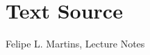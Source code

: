 \documentclass{ximera}
\begin{document}
\begin{example}
\begin{explanation}


\end{explanation}

\end{example}

\section*{Text Source}
Felipe L. Martins, Lecture Notes
\end{document}
